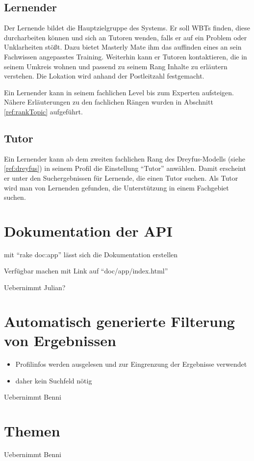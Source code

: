 \subsection{Lernender}
Der Lernende bildet die Hauptzielgruppe des Systems. Er soll WBTs finden, diese
durcharbeiten können und sich an Tutoren wenden, falls er auf ein Problem oder
Unklarheiten stößt. Dazu bietet Masterly Mate ihm das auffinden eines an sein
Fachwissen angepasstes Training. Weiterhin kann er Tutoren kontaktieren, die in
seinem Umkreis wohnen und passend zu seinem Rang Inhalte zu erläutern verstehen.
Die Lokation wird anhand der Postleitzahl festgemacht.

Ein Lernender kann in seinem fachlichen Level bis zum Experten aufsteigen.
Nähere Erläuterungen zu den fachlichen Rängen wurden in Abschnitt
\ref{ref:rankTopic} aufgeführt.

\subsection{Tutor}
Ein Lernender kann ab dem zweiten fachlichen Rang des Dreyfus-Modells (siehe
\ref{ref:dreyfus}) in seinem Profil die Einstellung "`Tutor"' anwählen. Damit
erscheint er unter den Suchergebnissen für Lernende, die einen Tutor suchen. Als
Tutor wird man von Lernenden gefunden, die Unterstützung in einem Fachgebiet
suchen.

\section{Dokumentation der API}
\begin {k}
mit "`rake doc:app"' lässt sich die Dokumentation erstellen

Verfügbar machen mit Link auf "`doc/app/index.html"'

Uebernimmt Julian?
\end{k}

\section{Automatisch generierte Filterung von Ergebnissen}
\begin{k}
\begin{itemize}
  \item Profilinfos werden ausgelesen und zur Eingrenzung der Ergebnisse
  verwendet
  \item daher kein Suchfeld nötig
\end{itemize}

Uebernimmt Benni
\end{k}

\section{Themen}
\begin{k}
Uebernimmt Benni
\end{k}